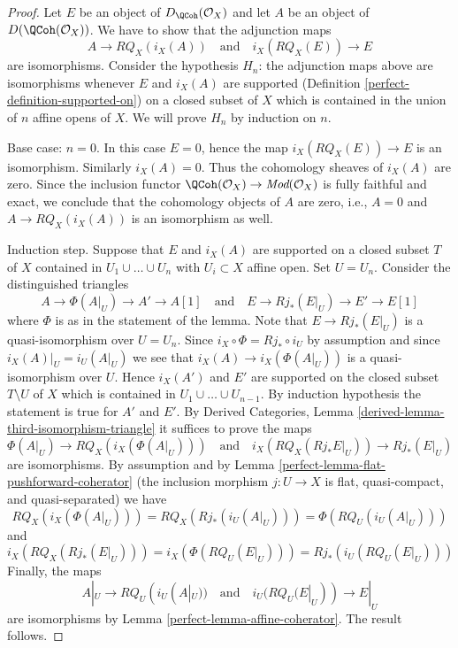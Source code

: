 \begin{proof}

Let $E$ be an object of $D_\QCoh(\mathcal{O}_X)$ and
let $A$ be an object of $D(\QCoh(\mathcal{O}_X))$.
We have to show that the adjunction maps
$$
A \to RQ_X(i_X(A))
\quad\text{and}\quad
i_X(RQ_X(E)) \to E
$$
are isomorphisms. Consider the hypothesis
$H_n$: the adjunction maps above are isomorphisms
whenever $E$ and $i_X(A)$ are supported
(Definition \ref{perfect-definition-supported-on})
on a closed subset of $X$ which
is contained in the union of $n$ affine opens of $X$.
We will prove $H_n$ by induction on $n$.

\medskip\noindent
Base case: $n = 0$. In this case $E = 0$, hence the map
$i_X(RQ_X(E)) \to E$ is an isomorphism. Similarly $i_X(A) = 0$.
Thus the cohomology sheaves of $i_X(A)$ are zero. Since the inclusion
functor $\QCoh(\mathcal{O}_X) \to \textit{Mod}(\mathcal{O}_X)$
is fully faithful and exact, we conclude that the cohomology
objects of $A$ are zero, i.e., $A = 0$ and
$A \to RQ_X(i_X(A))$ is an isomorphism as well.

\medskip\noindent
Induction step. Suppose that $E$ and $i_X(A)$ are supported on a
closed subset $T$ of $X$ contained in $U_1 \cup \ldots \cup U_n$
with $U_i \subset X$ affine open. Set $U = U_n$.
Consider the distinguished triangles
$$
A \to \Phi(A|_U) \to A' \to A[1]
\quad\text{and}\quad
E \to Rj_*(E|_U) \to E' \to E[1]
$$
where $\Phi$ is as in the statement of the lemma.
Note that $E \to Rj_*(E|_U)$ is a quasi-isomorphism over $U = U_n$.
Since $i_X \circ \Phi = Rj_* \circ i_U$ by assumption
and since $i_X(A)|_U = i_U(A|_U)$
we see that $i_X(A) \to i_X(\Phi(A|_U))$ is a quasi-isomorphism over $U$.
Hence $i_X(A')$ and $E'$ are supported on the closed
subset $T \setminus U$ of $X$ which is contained in
$U_1 \cup \ldots \cup U_{n - 1}$.
By induction hypothesis the statement is true for $A'$ and $E'$. By
Derived Categories, Lemma \ref{derived-lemma-third-isomorphism-triangle}
it suffices to prove the maps
$$
\Phi(A|_U) \to RQ_X(i_X(\Phi(A|_U)))
\quad\text{and}\quad
i_X(RQ_X(Rj_*E|_U)) \to Rj_*(E|_U)
$$
are isomorphisms. By assumption and by
Lemma \ref{perfect-lemma-flat-pushforward-coherator}
(the inclusion morphism $j : U \to X$ is flat, quasi-compact, and
quasi-separated) we have
$$
RQ_X(i_X(\Phi(A|_U))) = RQ_X(Rj_*(i_U(A|_U))) = \Phi(RQ_U(i_U(A|_U)))
$$
and
$$
i_X(RQ_X(Rj_*(E|_U))) = i_X(\Phi(RQ_U(E|_U))) = Rj_*(i_U(RQ_U(E|_U)))
$$
Finally, the maps
$$
A|_U \to RQ_U(i_U(A|_U))
\quad\text{and}\quad
i_U(RQ_U(E|_U)) \to E|_U
$$
are isomorphisms by Lemma \ref{perfect-lemma-affine-coherator}. The result follows.
\end{proof}

